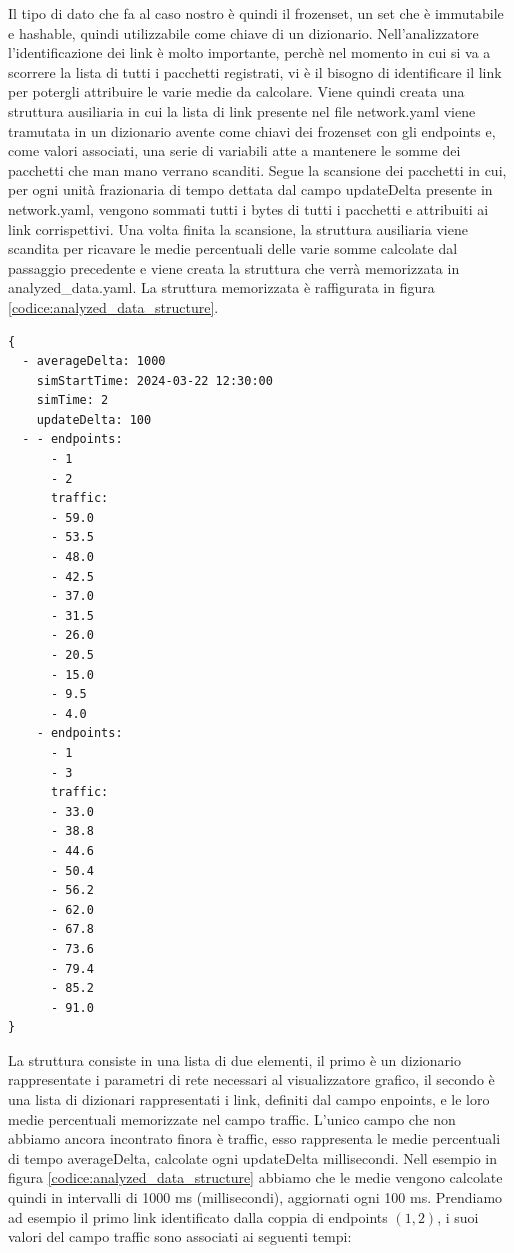 \documentclass[binding=0.6cm]{sapthesis}
\begin{document}
Il tipo di dato che fa al caso nostro è quindi il frozenset, un set che è immutabile e hashable, quindi utilizzabile come chiave di un dizionario.
Nell'analizzatore l'identificazione dei link è molto importante, perchè nel momento in cui si va a scorrere la lista di tutti i pacchetti registrati,
vi è il bisogno di identificare il link per potergli attribuire le varie medie da calcolare. Viene quindi creata una struttura ausiliaria in cui
la lista di link presente nel file network.yaml viene tramutata in un dizionario avente come chiavi dei frozenset con gli endpoints e, come valori associati,
una serie di variabili atte a mantenere le somme dei pacchetti che man mano verrano scanditi.
Segue la scansione dei pacchetti in cui, per ogni unità frazionaria di tempo dettata dal campo updateDelta presente in network.yaml, vengono sommati tutti i bytes di tutti i pacchetti
e attribuiti ai link corrispettivi.
Una volta finita la scansione, la struttura ausiliaria viene scandita per ricavare le medie percentuali delle varie somme calcolate dal passaggio precedente e viene
creata la struttura che verrà memorizzata in analyzed\_data.yaml. La struttura memorizzata è raffigurata in figura \ref{codice:analyzed_data_structure}.

{\scriptsize %
\begin{lstlisting}[caption={rappresentazione della struttura analyzed\_data}, label={codice:analyzed_data_structure}]
{
  - averageDelta: 1000
    simStartTime: 2024-03-22 12:30:00
    simTime: 2
    updateDelta: 100
  - - endpoints:
      - 1
      - 2
      traffic:
      - 59.0
      - 53.5
      - 48.0
      - 42.5
      - 37.0
      - 31.5
      - 26.0
      - 20.5
      - 15.0
      - 9.5
      - 4.0
    - endpoints:
      - 1
      - 3
      traffic:
      - 33.0
      - 38.8
      - 44.6
      - 50.4
      - 56.2
      - 62.0
      - 67.8
      - 73.6
      - 79.4
      - 85.2
      - 91.0
}
\end{lstlisting}
}

La struttura consiste in una lista di due elementi, il primo è un dizionario rappresentate 
i parametri di rete necessari al visualizzatore grafico, il
secondo è una lista di dizionari rappresentati i link, definiti dal campo enpoints, e le loro medie percentuali memorizzate nel campo traffic.
L'unico campo che non abbiamo ancora incontrato finora è traffic, esso rappresenta le medie percentuali di tempo averageDelta, calcolate ogni updateDelta millisecondi.
Nell esempio in figura \ref{codice:analyzed_data_structure} abbiamo che le medie vengono calcolate quindi in intervalli di 1000 ms (millisecondi), aggiornati ogni
100 ms. Prendiamo ad esempio il primo link identificato dalla coppia di endpoints \((1, 2)\), i suoi valori del campo traffic sono associati ai seguenti tempi:
\newline
\end{document}
